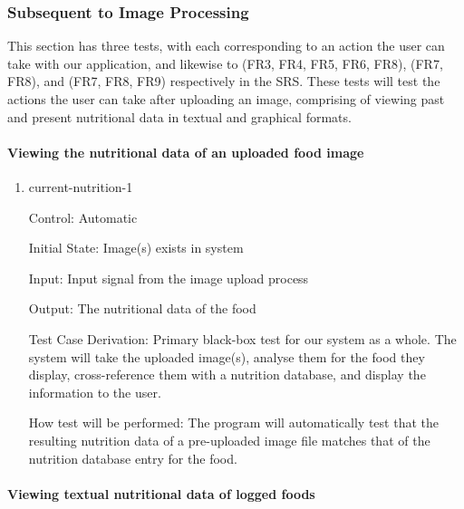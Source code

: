 \documentclass[12pt, titlepage]{article}
\begin{document}
	\subsubsection{Subsequent to Image Processing}
	This section has three tests, with each corresponding to an action the user can take with our application, and likewise to (FR3, FR4, FR5, FR6, FR8), (FR7, FR8), and (FR7, FR8, FR9) respectively in the SRS. These tests will test the actions the user can take after uploading an image, comprising of viewing past and present nutritional data in textual and graphical formats.
	
	
	
	\paragraph{Viewing the nutritional data of an uploaded food image}
	
	\begin{enumerate}
		
		\item{current-nutrition-1\\}
		
		Control: Automatic
		
		Initial State: Image(s) exists in system
		
		Input: Input signal from the image upload process
		
		Output: The nutritional data of the food
		
		Test Case Derivation: Primary black-box test for our system as a whole. The system will take the uploaded image(s), analyse them for the food they display, cross-reference them with a nutrition database, and display the information to the user.
		
		How test will be performed: The program will automatically test that the resulting nutrition data of a pre-uploaded image file matches that of the nutrition database entry for the food.
		
	\end{enumerate}
	
	\paragraph{Viewing textual nutritional data of logged foods}
	
\end{document}
